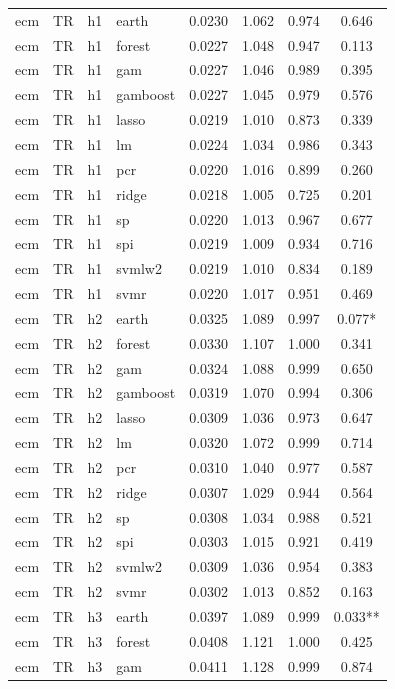 \begin{ThreePartTable}
\begin{longtable}[t]{llclcccc}
\addlinespace
ecm & TR & h1 & earth & 0.0230 & 1.062 & 0.974 & 0.646\\
ecm & TR & h1 & forest & 0.0227 & 1.048 & 0.947 & 0.113\\
ecm & TR & h1 & gam & 0.0227 & 1.046 & 0.989 & 0.395\\
ecm & TR & h1 & gamboost & 0.0227 & 1.045 & 0.979 & 0.576\\
ecm & TR & h1 & lasso & 0.0219 & 1.010 & 0.873 & 0.339\\
ecm & TR & h1 & lm & 0.0224 & 1.034 & 0.986 & 0.343\\
ecm & TR & h1 & pcr & 0.0220 & 1.016 & 0.899 & 0.260\\
ecm & TR & h1 & ridge & 0.0218 & 1.005 & 0.725 & 0.201\\
ecm & TR & h1 & sp & 0.0220 & 1.013 & 0.967 & 0.677\\
ecm & TR & h1 & spi & 0.0219 & 1.009 & 0.934 & 0.716\\
ecm & TR & h1 & svmlw2 & 0.0219 & 1.010 & 0.834 & 0.189\\
ecm & TR & h1 & svmr & 0.0220 & 1.017 & 0.951 & 0.469\\
\addlinespace
ecm & TR & h2 & earth & 0.0325 & 1.089 & 0.997 & 0.077*\\
ecm & TR & h2 & forest & 0.0330 & 1.107 & 1.000 & 0.341\\
ecm & TR & h2 & gam & 0.0324 & 1.088 & 0.999 & 0.650\\
ecm & TR & h2 & gamboost & 0.0319 & 1.070 & 0.994 & 0.306\\
ecm & TR & h2 & lasso & 0.0309 & 1.036 & 0.973 & 0.647\\
ecm & TR & h2 & lm & 0.0320 & 1.072 & 0.999 & 0.714\\
ecm & TR & h2 & pcr & 0.0310 & 1.040 & 0.977 & 0.587\\
ecm & TR & h2 & ridge & 0.0307 & 1.029 & 0.944 & 0.564\\
ecm & TR & h2 & sp & 0.0308 & 1.034 & 0.988 & 0.521\\
ecm & TR & h2 & spi & 0.0303 & 1.015 & 0.921 & 0.419\\
ecm & TR & h2 & svmlw2 & 0.0309 & 1.036 & 0.954 & 0.383\\
ecm & TR & h2 & svmr & 0.0302 & 1.013 & 0.852 & 0.163\\
\addlinespace
ecm & TR & h3 & earth & 0.0397 & 1.089 & 0.999 & 0.033**\\
ecm & TR & h3 & forest & 0.0408 & 1.121 & 1.000 & 0.425\\
ecm & TR & h3 & gam & 0.0411 & 1.128 & 0.999 & 0.874\\

\end{longtable}
\end{ThreePartTable}
